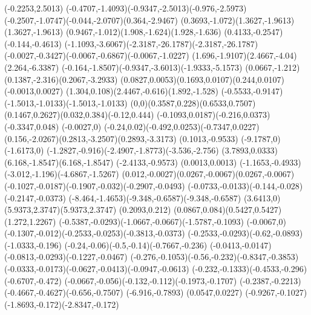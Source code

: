 {    \rlineto(-0.2253,2.5013)
    \rcurveto(-0.4707,-1.4093)(-0.9347,-2.5013)(-0.976,-2.5973)
    \rcurveto(-0.2507,-1.0747)(-0.044,-2.0707)(0.364,-2.9467)
    \rcurveto(0.3693,-1.072)(1.3627,-1.9613)(1.3627,-1.9613)
    \rcurveto(0.9467,-1.012)(1.908,-1.624)(1.928,-1.636)
    \rlineto(0.4133,-0.2547)
    \rlineto(-0.144,-0.4613)
    \rcurveto(-1.1093,-3.6067)(-2.3187,-26.1787)(-2.3187,-26.1787)
    \rcurveto(-0.0027,-0.3427)(-0.0067,-0.6867)(-0.0067,-1.0227)
    \rcurveto(1.696,-1.9107)(2.4667,-4.04)(2.264,-6.3387)
    \rcurveto(-0.164,-1.8507)(-0.9347,-3.6013)(-1.9333,-5.1573)
    \rcurveto(0.0667,-1.212)(0.1387,-2.316)(0.2067,-3.2933)
    \rcurveto(0.0827,0.0053)(0.1693,0.0107)(0.244,0.0107)
    \rlineto(-0.0013,0.0027)
    \rcurveto(1.304,0.108)(2.4467,-0.616)(1.892,-1.528)
    \rcurveto(-0.5533,-0.9147)(-1.5013,-1.0133)(-1.5013,-1.0133)
    \rcurveto(0,0)(0.3587,0.228)(0.6533,0.7507)
    \rcurveto(0.1467,0.2627)(0.032,0.384)(-0.12,0.444)
    \rcurveto(-0.1093,0.0187)(-0.216,0.0373)(-0.3347,0.048)
    \rlineto(-0.0027,0)
    \rcurveto(-0.24,0.02)(-0.492,0.0253)(-0.7347,0.0227)
    \rcurveto(0.156,-2.0267)(0.2813,-3.2507)(0.2893,-3.3173)
    \rlineto(0.1013,-0.9533)
    \rlineto(-9.1787,0)
    \rlineto(-1.6173,0)
    \rcurveto(-1.2827,-0.916)(-2.4907,-1.8773)(-3.536,-2.756)
    \rcurveto(3.7893,0.0333)(6.168,-1.8547)(6.168,-1.8547)
    \rlineto(-2.4133,-0.9573)
    \rlineto(0.0013,0.0013)
    \rcurveto(-1.1653,-0.4933)(-3.012,-1.196)(-4.6867,-1.5267)
    \rcurveto(0.012,-0.0027)(0.0267,-0.0067)(0.0267,-0.0067)
    \rcurveto(-0.1027,-0.0187)(-0.1907,-0.032)(-0.2907,-0.0493)
    \rcurveto(-0.0733,-0.0133)(-0.144,-0.028)(-0.2147,-0.0373)
    \rcurveto(-8.464,-1.4653)(-9.348,-0.6587)(-9.348,-0.6587)
    \rcurveto(3.6413,0)(5.9373,2.3747)(5.9373,2.3747)
    \rlineto(0.2093,0.212)
    \rcurveto(0.0867,0.084)(0.5427,0.5427)(1.272,1.2267)
    \rcurveto(-0.5387,-0.0293)(-1.0667,-0.0667)(-1.5787,-0.1093)
    \rlineto(-0.0067,0)
    \rcurveto(-0.1307,-0.012)(-0.2533,-0.0253)(-0.3813,-0.0373)
    \rcurveto(-0.2533,-0.0293)(-0.62,-0.0893)(-1.0333,-0.196)
    \rcurveto(-0.24,-0.06)(-0.5,-0.14)(-0.7667,-0.236)
    \rcurveto(-0.0413,-0.0147)(-0.0813,-0.0293)(-0.1227,-0.0467)
    \rcurveto(-0.276,-0.1053)(-0.56,-0.232)(-0.8347,-0.3853)
    \rcurveto(-0.0333,-0.0173)(-0.0627,-0.0413)(-0.0947,-0.0613)
    \rcurveto(-0.232,-0.1333)(-0.4533,-0.296)(-0.6707,-0.472)
    \rcurveto(-0.0667,-0.056)(-0.132,-0.112)(-0.1973,-0.1707)
    \rcurveto(-0.2387,-0.2213)(-0.4667,-0.4627)(-0.656,-0.7507)
    \rlineto(-6.916,-0.7893)
    \rlineto(0.0547,0.0227)
    \rcurveto(-0.9267,-0.1027)(-1.8693,-0.172)(-2.8347,-0.172)
}
